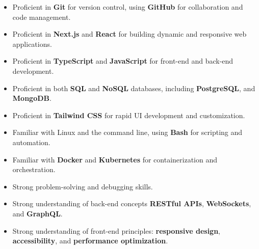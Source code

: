 \documentclass[9pt,a4paper,ragged2e,withhyper]{altacv}
\begin{document}
\begin{paracol}{2}
	\begin{itemize}
		\item Proficient in \textbf{Git} for version control, using \textbf{GitHub} for collaboration and code management.
		\item Proficient in \textbf{Next.js} and \textbf{React} for building dynamic and responsive web applications.
		\item Proficient in \textbf{TypeScript} and \textbf{JavaScript} for front-end and back-end development.
		\item Proficient in both \textbf{SQL} and \textbf{NoSQL} databases, including \textbf{PostgreSQL}, and \textbf{MongoDB}.
		\item Proficient in \textbf{Tailwind CSS} for rapid UI development and customization.
		\item Familiar with Linux and the command line, using \textbf{Bash} for scripting and automation.
		\item Familiar with \textbf{Docker} and \textbf{Kubernetes} for containerization and orchestration.
		\item Strong problem-solving and debugging skills.
		\item Strong understanding of back-end concepts \textbf{RESTful APIs}, \textbf{WebSockets}, and \textbf{GraphQL}.
		\item Strong understanding of front-end principles: \textbf{responsive design}, \textbf{accessibility}, and \textbf{performance optimization}.
	\end{itemize}
\end{paracol}

\newpage


\end{document}
